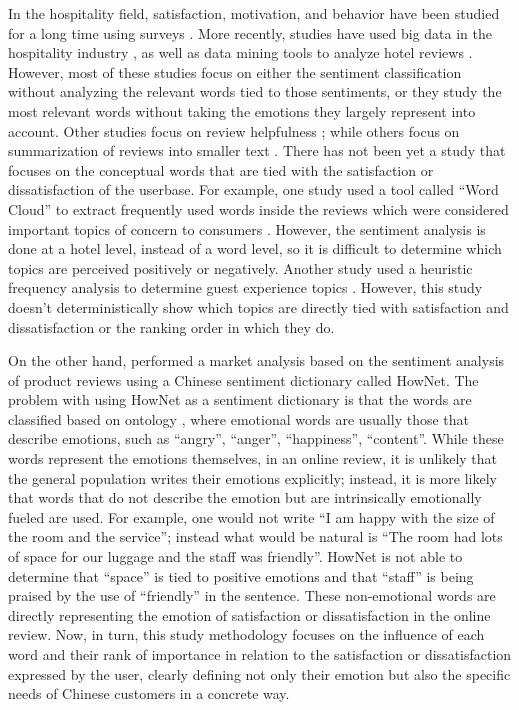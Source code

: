 \documentclass[review]{elsarticle}
\begin{document}
In the hospitality field, satisfaction, motivation, and behavior have been studied for a long time using surveys \cite[e.g.][]{truong2009, wu2009, shanka2004, kozak2002, romao2014, dongyang2015, chan201518}. More recently, studies have used big data in the hospitality industry \cite[e.g.][]{yang2014, loh2003}, as well as data mining tools to analyze hotel reviews \cite[e.g.][]{alsmadi2018, browning2013, xiang2010}. However, most of these studies focus on either the sentiment classification without analyzing the relevant words tied to those sentiments, or they study the most relevant words without taking the emotions they largely represent into account. Other studies focus on review helpfulness \cite[][]{ren2019}; while others focus on summarization of reviews into smaller text \cite[e.g.][]{hu2017436, amplayo201754}. There has not been yet a study that focuses on the conceptual words that are tied with the satisfaction or dissatisfaction of the userbase. For example, one study used a tool called “Word Cloud” to extract frequently used words inside the reviews which were considered important topics of concern to consumers \cite[][]{hargreaves2015}. However, the sentiment analysis is done at a hotel level, instead of a word level, so it is difficult to determine which topics are perceived positively or negatively. Another study used a heuristic frequency analysis to determine guest experience topics \cite[][]{xiang2015}. However, this study doesn't deterministically show which topics are directly tied with satisfaction and dissatisfaction or the ranking order in which they do.

On the other hand, \cite{zhang2011} performed a market analysis based on the sentiment analysis of product reviews using a Chinese sentiment dictionary called HowNet. The problem with using HowNet as a sentiment dictionary is that the words are classified based on ontology \cite[][]{huang2008}, where emotional words are usually those that describe emotions, such as “angry”, “anger”, “happiness”, “content”. While these words represent the emotions themselves, in an online review, it is unlikely that the general population writes their emotions explicitly; instead, it is more likely that words that do not describe the emotion but are intrinsically emotionally fueled are used. For example, one would not write “I am happy with the size of the room and the service”; instead what would be natural is “The room had lots of space for our luggage and the staff was friendly”. HowNet is not able to determine that “space” is tied to positive emotions and that “staff” is being praised by the use of “friendly” in the sentence. These non-emotional words are directly representing the emotion of satisfaction or dissatisfaction in the online review. Now, in turn, this study methodology focuses on the influence of each word and their rank of importance in relation to the satisfaction or dissatisfaction expressed by the user, clearly defining not only their emotion but also the specific needs of Chinese customers in a concrete way.
\end{document}

